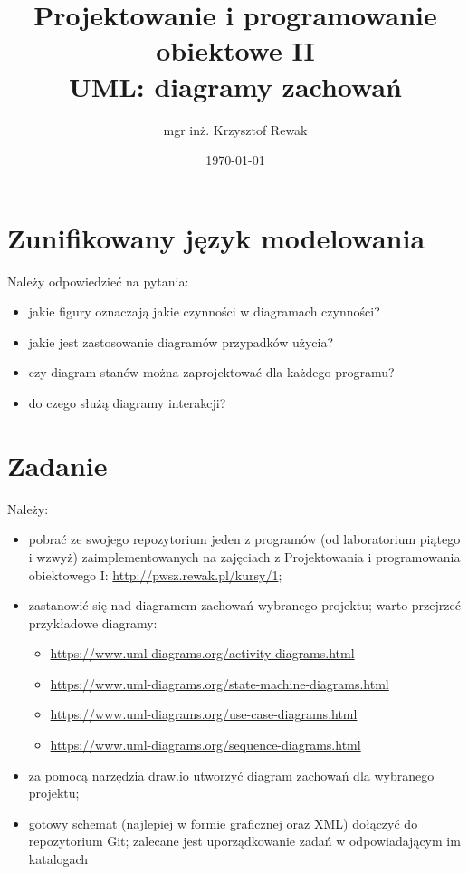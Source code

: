 \documentclass{article}
\title{
	Projektowanie i programowanie obiektowe II\\
	\Huge{UML: diagramy zachowań}
}
\author{mgr inż. Krzysztof Rewak}
\date{\today}
\begin{document}
	\maketitle

	\section{Zunifikowany język modelowania}
	Należy odpowiedzieć na pytania:
	\begin{itemize}
		\item jakie figury oznaczają jakie czynności w diagramach czynności?
		\item jakie jest zastosowanie diagramów przypadków użycia?
		\item czy diagram stanów można zaprojektować dla każdego programu?
		\item do czego służą diagramy interakcji?
	\end{itemize}
	
	\section{Zadanie}
	Należy:
	\begin{itemize}
		\item pobrać ze swojego repozytorium jeden z programów (od laboratorium piątego i wzwyż) zaimplementowanych na zajęciach z Projektowania i programowania obiektowego I: \url{http://pwsz.rewak.pl/kursy/1};
		\item zastanowić się nad diagramem zachowań wybranego projektu; warto przejrzeć przykładowe diagramy:
		\begin{itemize}
			\item \url{https://www.uml-diagrams.org/activity-diagrams.html}
			\item \url{https://www.uml-diagrams.org/state-machine-diagrams.html}
			\item \url{https://www.uml-diagrams.org/use-case-diagrams.html}
			\item \url{https://www.uml-diagrams.org/sequence-diagrams.html}
		\end{itemize}
		\item za pomocą narzędzia \href{https://www.draw.io/}{draw.io} utworzyć diagram zachowań dla wybranego projektu;
		\item gotowy schemat (najlepiej w formie graficznej oraz XML) dołączyć do repozytorium Git; zalecane jest uporządkowanie zadań w odpowiadającym im katalogach
	\end{itemize}
\end{document}
